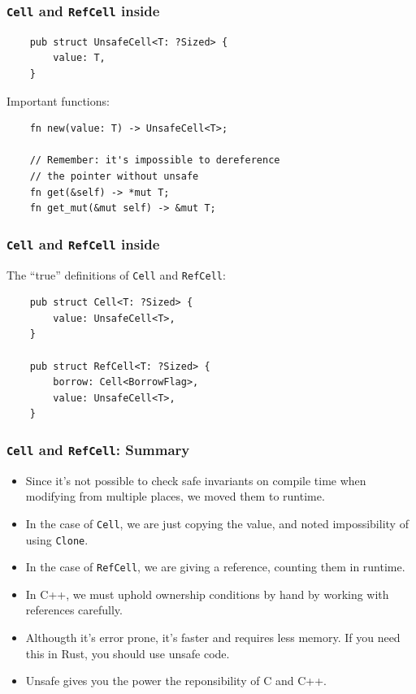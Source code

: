 \documentclass[aspectratio=1610,t]{beamer}
\begin{document}

\begin{frame}[fragile]
\frametitle{\texttt{Cell} and \texttt{RefCell} inside}
\begin{verbatim}
    pub struct UnsafeCell<T: ?Sized> {
        value: T,
    }
\end{verbatim}

Important functions:

\begin{verbatim}
    fn new(value: T) -> UnsafeCell<T>;

    // Remember: it's impossible to dereference
    // the pointer without unsafe
    fn get(&self) -> *mut T;
    fn get_mut(&mut self) -> &mut T;
\end{verbatim}
\end{frame}


\begin{frame}[fragile]
\frametitle{\texttt{Cell} and \texttt{RefCell} inside}
The ``true'' definitions of \texttt{Cell} and \texttt{RefCell}:

\begin{verbatim}
    pub struct Cell<T: ?Sized> {
        value: UnsafeCell<T>,
    }

    pub struct RefCell<T: ?Sized> {
        borrow: Cell<BorrowFlag>,
        value: UnsafeCell<T>,
    }
\end{verbatim}
\end{frame}


\begin{frame}[fragile]
\frametitle{\texttt{Cell} and \texttt{RefCell}: Summary}
\begin{itemize}
    \item<1-> Since it's not possible to check safe invariants on compile time when modifying from multiple places, we moved them to runtime.
    \item<2-> In the case of \texttt{Cell}, we are just copying the value, and noted impossibility of using \texttt{Clone}.
    \item<3-> In the case of \texttt{RefCell}, we are giving a reference, counting them in runtime.
    \item<4-> In C++, we must uphold ownership conditions by hand by working with references carefully.
    \item<5-> Althougth it's error prone, it's faster and requires less memory. If you need this in Rust, you should use unsafe code.
    \item<6-> Unsafe gives you the power the reponsibility of C and C++.
\end{itemize}
\end{frame}
\end{document}
